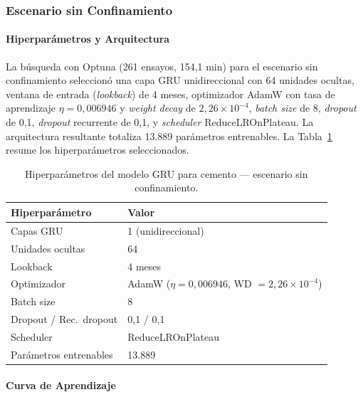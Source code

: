 \subsubsection{Escenario sin Confinamiento}

\paragraph{Hiperparámetros y Arquitectura}

\justify
La búsqueda con Optuna (261 ensayos, 154,1 min) para el escenario sin confinamiento seleccionó una capa GRU unidireccional con 64 unidades ocultas, ventana de entrada (\textit{lookback}) de 4 meses, optimizador AdamW con tasa de aprendizaje $\eta = 0{,}006946$ y \textit{weight decay} de $2{,}26 \times 10^{-4}$, \textit{batch size} de 8, \textit{dropout} de 0{,}1, \textit{dropout} recurrente de 0{,}1, y \textit{scheduler} ReduceLROnPlateau. La arquitectura resultante totaliza 13.889 parámetros entrenables. La Tabla~\ref{tab:gru_cemento_sc_arq} resume los hiperparámetros seleccionados.

\begin{table}[H]
    \centering
    \caption{Hiperparámetros del modelo GRU para cemento --- escenario sin confinamiento.}
    \label{tab:gru_cemento_sc_arq}
    \begin{tabular}{ll}
        \toprule
        \textbf{Hiperparámetro} & \textbf{Valor} \\
        \midrule
        Capas GRU              & 1 (unidireccional) \\
        Unidades ocultas       & 64 \\
        Lookback               & 4 meses \\
        Optimizador            & AdamW ($\eta=0{,}006946$, WD $=2{,}26 \times 10^{-4}$) \\
        Batch size             & 8 \\
        Dropout / Rec.\ dropout & 0{,}1 / 0{,}1 \\
        Scheduler              & ReduceLROnPlateau \\
        Parámetros entrenables & 13.889 \\
        \bottomrule
    \end{tabular}
\end{table}

\paragraph{Curva de Aprendizaje}

